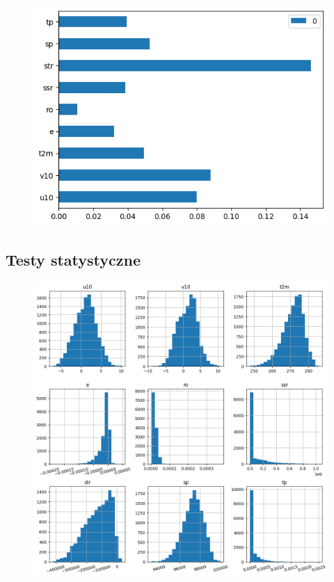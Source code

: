 \begin{figure}[H]
    \centering
    \includegraphics[width=\textwidth]{images/svr_mae_bar.png}
    \caption{}
    \label{svr-mae-bar}
\end{figure}

\subsection{Testy statystyczne}

\begin{figure}[H]
    \centering
    \includegraphics[width=\textwidth]{images/hist.png}
    \caption{}
    \label{real-hist}
\end{figure}

